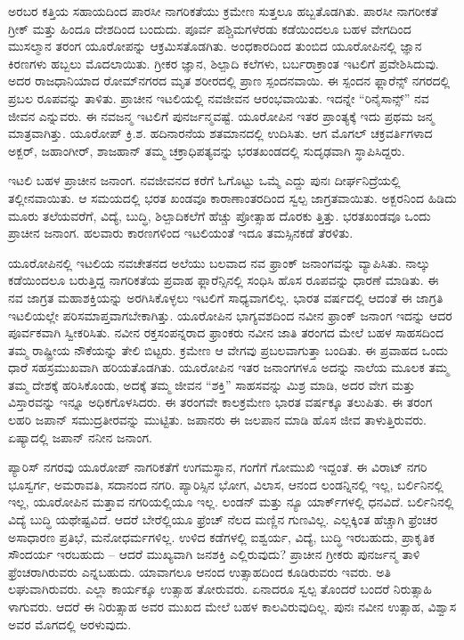 ಅರಬರ ಕತ್ತಿಯ ಸಹಾಯದಿಂದ ಪಾರಸೀ ನಾಗರಿಕತೆಯು ಕ್ರಮೇಣ ಸುತ್ತಲೂ ಹಬ್ಬತೊಡಗಿತು. ಪಾರಸೀ ನಾಗರೀಕತೆ ಗ್ರೀಕ್​ ಮತ್ತು ಹಿಂದೂ ದೇಶದಿಂದ ಬಂದುದು. ಪೂರ್ವ ಪಶ್ಚಿಮಗಳೆರಡು ಕಡೆಯಿಂದಲೂ ಬಹಳ ವೇಗದಿಂದ ಮುಸಲ್ಮಾನ ತರಂಗ ಯೂರೋಪನ್ನು ಆಕ್ರಮಿಸತೊಡಗಿತು. ಅಂಧಕಾರದಿಂದ ತುಂಬಿದ ಯೂರೋಪಿನಲ್ಲಿ ಜ್ಞಾನ ಕಿರಣಗಳು ಹಬ್ಬಲು ಮೊದಲಾಯಿತು. ಗ್ರೀಕರ ಜ್ಞಾನ, ಶಿಲ್ಪಾದಿ ಕಲೆಗಳು, ಬರ್ಬರಾಕ್ರಾಂತ ಇಟಲಿಗೆ ಪ್ರವೇಶಿಸಿದುವು. ಅದರ ರಾಜಧಾನಿಯಾದ ರೋಮ್​ನಗರದ ಮೃತ ಶರೀರದಲ್ಲಿ ಪ್ರಾಣ ಸ್ಪಂದನವಾಯಿ. ಈ ಸ್ಪಂದನ ಫ್ಲಾರೆನ್ಸ್​ ನಗರದಲ್ಲಿ ಪ್ರಬಲ ರೂಪವನ್ನು ತಾಳಿತು. ಪ್ರಾಚೀನ ಇಟಲಿಯಲ್ಲಿ ನವಜೀವನ ಆರಂಭವಾಯಿತು. ಇದನ್ನೇ “ರಿನೈಸಾನ್ಸ್​” ನವ ಜೀವನ ಎನ್ನುವರು. ಈ ನವಜನ್ಮ ಇಟಲಿಗೆ ಪುನರ್ಜನ್ಮವಷ್ಟೆ. ಯೂರೋಪಿನ ಇತರ ಪ್ರಾಂತ್ಯಕ್ಕೆ ಇದು ಪ್ರಥಮ ಜನ್ಮ ಮಾತ್ರವಾಗಿತ್ತು. ಯೂರೋಪ್​ ಕ್ರಿ.ಶ. ಹದಿನಾರನೆಯ ಶತಮಾನದಲ್ಲಿ ಉದಿಸಿತು. ಆಗ ಮೊಗಲ್​ ಚಕ್ರವರ್ತಿಗಳಾದ ಅಕ್ಬರ್​, ಜಹಾಂಗೀರ್​, ಶಾಜಹಾನ್​ ತಮ್ಮ ಚಕ್ರಾಧಿಪತ್ಯವನ್ನು ಭರತಖಂಡದಲ್ಲಿ ಸುದೃಢವಾಗಿ ಸ್ಥಾಪಿಸಿದ್ದರು.

ಇಟಲಿ ಬಹಳ ಪ್ರಾಚೀನ ಜನಾಂಗ. ನವಜೀವನದ ಕರೆಗೆ ಓಗೊಟ್ಟು ಒಮ್ಮೆ ಎದ್ದು ಪುನಃ ದೀರ್ಘನಿದ್ರೆಯಲ್ಲಿ ತಲ್ಲೀನವಾಯಿತು. ಆ ಸಮಯದಲ್ಲಿ ಭರತ ಖಂಡವೂ ಕಾರಾಣಾಂತರದಿಂದ ಸ್ವಲ್ಪ ಜಾಗ್ರತವಾಯಿತು. ಅಕ್ಬರನಿಂದ ಹಿಡಿದು ಮೂರು ತಲೆಯವರೆಗೆ, ವಿದ್ಯೆ, ಬುದ್ಧಿ, ಶಿಲ್ಪಾದಿಕಲೆಗೆ ಹೆಚ್ಚು ಪ್ರೋತ್ಸಾಹ ದೊರಕು ತ್ತಿತ್ತು. ಭರತಖಂಡವೂ ಒಂದು ಪ್ರಾಚೀನ ಜನಾಂಗ. ಹಲವಾರು ಕಾರಣಗಳಿಂದ ಇಟಲಿಯಂತೆ ಇದೂ ತಮಸ್ಸಿನಕಡೆ ತೆರಳಿತು.

ಯೂರೋಪಿನಲ್ಲಿ ಇಟಲಿಯ ನವಚೇತನದ ಅಲೆಯು ಬಲವಾದ ನವ ಫ್ರಾಂಕ್​ ಜನಾಂಗವನ್ನು ವ್ಯಾಪಿಸಿತು. ನಾಲ್ಕು ಕಡೆಯಿಂದಲೂ ಬರುತ್ತಿದ್ದ ನಾಗರಿಕತೆಯ ಪ್ರವಾಹ ಫ್ಲಾರೆನ್ಸಿನಲ್ಲಿ ಸಂಧಿಸಿ ಹೊಸ ರೂಪವನ್ನು ಧಾರಣೆ ಮಾಡಿತು. ಈ ನವ ಜಾಗ್ರತ ಮಹಾಶಕ್ತಿಯನ್ನು ಅರಗಿಸಿಕೊಳ್ಳಲು ಇಟಲಿಗೆ ಸಾಧ್ಯವಾಗಲಿಲ್ಲ. ಭಾರತ ವರ್ಷದಲ್ಲಿ ಆದಂತೆ ಈ ಜಾಗ್ರತಿ ಇಟಲಿಯಲ್ಲೇ ಪರಿಸಮಾಪ್ತವಾಗಬೇಕಾಗಿತ್ತು. ಯೂರೋಪಿನ ಭಾಗ್ಯವಶದಿಂದ ನವೀನ ಫ್ರಾಂಕ್​ ಜನಾಂಗ ಇದನ್ನು ಆದರ ಪೂರ್ವಕವಾಗಿ ಸ್ವೀಕರಿಸಿತು. ನವೀನ ರಕ್ತಸಂಪನ್ನರಾದ ಫ್ರಾಂಕರು ನವೀನ ಜಾತಿ ತರಂಗದ ಮೇಲೆ ಬಹಳ ಸಾಹಸದಿಂದ ತಮ್ಮ ರಾಷ್ಟ್ರೀಯ ನೌಕೆಯನ್ನು ತೇಲಿ ಬಿಟ್ಟರು. ಕ್ರಮೇಣ ಆ ವೇಗವು ಪ್ರಬಲವಾಗುತ್ತಾ ಬಂದಿತು. ಈ ಪ್ರವಾಹದ ಒಂದು ಧಾರೆ ಸಹಸ್ರಮುಖವಾಗಿ ಹರಿಯತೊಡಗಿತು. ಯೂರೋಪಿನ ಇತರ ಜನಾಂಗಗಳೂ ಅದನ್ನು ನಾಲೆಯ ಮೂಲಕ ತಮ್ಮ ತಮ್ಮ ದೇಶಕ್ಕೆ ಹರಿಸಿಕೊಂಡು, ಅದಕ್ಕೆ ತಮ್ಮ ಜೀವನ “ಶಕ್ತಿ” ಸಾಹಸವನ್ನು ಮಿಶ್ರ ಮಾಡಿ, ಅದರ ವೇಗ ಮತ್ತು ವಿಸ್ತಾರವನ್ನು ಇನ್ನೂ ಅಧಿಕಗೊಳಸಿದರು. ಈ ತರಂಗವೇ ಕಾಲಕ್ರಮೇಣ ಭಾರತ ವರ್ಷಕ್ಕೂ ತಲುಪಿತು. ಈ ತರಂಗ ಲಹರಿ ಜಪಾನ್​ ಸಮುದ್ರತೀರವನ್ನು ಮುಟ್ಟಿತು. ಜಪಾನರು ಈ ಜಲಪಾನ ಮಾಡಿ ಹೊಸ ಜೀವ ತಾಳುತ್ತಿರುವರು. ಏಷ್ಯಾದಲ್ಲಿ ಜಪಾನ್​ ನನೀನ ಜನಾಂಗ.

ಪ್ಯಾರಿಸ್​ ನಗರವು ಯೂರೋಪ್​ ನಾಗರಿಕತೆಗೆ ಉಗಮಸ್ಥಾನ, ಗಂಗೆಗೆ ಗೋಮುಖಿ ಇದ್ದಂತೆ. ಈ ವಿರಾಟ್​ ನಗರಿ ಭೂಸ್ವರ್ಗ, ಅಮರಾವತಿ, ಸದಾನಂದ ನಗರಿ. ಪ್ಯಾರಿಸ್ಸಿನ ಭೋಗ, ವಿಲಾಸ, ಆನಂದ ಲಂಡನ್ನಿನಲ್ಲಿ ಇಲ್ಲ, ಬರ್ಲಿನಿನಲ್ಲಿ ಇಲ್ಲ, ಯೂರೋಪಿನ ಮತ್ತಾವ ನಗರಿಯಲ್ಲಿಯೂ ಇಲ್ಲ. ಲಂಡನ್​ ಮತ್ತು ನ್ಯೂ ಯಾರ್ಕ್​ಗಳಲ್ಲಿ ಧನವಿದೆ. ಬರ್ಲಿನಿನಲ್ಲಿ ವಿದ್ಯೆ ಬುದ್ಧಿ ಯಥೇಷ್ಟವಿದೆ. ಆದರೆ ಬೇರೆಲ್ಲಿಯೂ ಫ್ರೆಂಚ್​ ನೆಲದ ಮಣ್ಣಿನ ಗುಣವಿಲ್ಲ. ಎಲ್ಲಕ್ಕಿಂತ ಹೆಚ್ಚಾಗಿ ಫ್ರೆಂಚರ ಅಸಾಧಾರಣ ಪ್ರತಿಭೆ, ಮನೋಧರ್ಮಗಳಿಲ್ಲ. ಉಳಿದ ಕಡೆಗಳಲ್ಲಿ ಐಶ್ವರ್ಯ, ವಿದ್ಯೆ, ಬುದ್ಧಿ ಇರಬಹುದು, ಪ್ರಾಕೃತಿಕ ಸೌಂದರ್ಯ ಇರಬಹುದು – ಆದರೆ ಮುಖ್ಯವಾಗಿ ಜನಶಕ್ತಿ ಎಲ್ಲಿರುವುದು? ಪ್ರಾಚೀನ ಗ್ರೀಕರು ಪುನರ್ಜನ್ಮ ತಾಳಿ ಫ್ರೆಂಚರಾಗಿರುವರು ಎನ್ನಬಹುದು. ಯಾವಾಗಲೂ ಆನಂದ ಉತ್ಸಾಹದಿಂದ ಕೂಡಿರುವರು ಇವರು. ಅತಿ ಲಘುವಾಗಿರುವರು. ಎಲ್ಲಾ ಕಾರ್ಯಕ್ಕೂ ಉತ್ಸಾಹ ತೋರುವರು. ಏನಾದರೂ ಸ್ವಲ್ಪ ತೊಂದರೆ ಬಂದರೆ ನಿರುತ್ಸಾಹಿ ಳಾಗುವರು. ಆದರೆ ಈ ನಿರುತ್ಸಾಹ ಅವರ ಮುಖದ ಮೇಲೆ ಬಹಳ ಕಾಲವಿರುವುದಿಲ್ಲ. ಪುನಃ ನವೀನ ಉತ್ಸಾಹ, ವಿಶ್ವಾಸ ಅವರ ಮೊಗದಲ್ಲಿ ಅರಳುವುದು.

